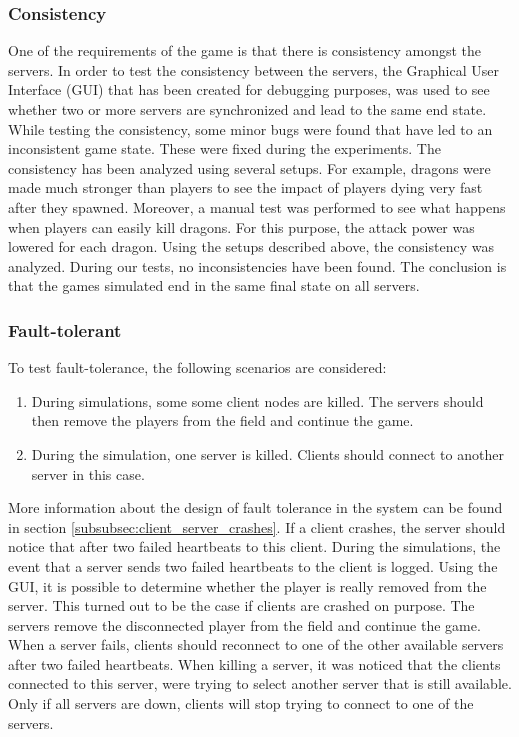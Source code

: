 	\subsubsection{Consistency}
	\label{subsubsec:consistency}
		One of the requirements of the game is that there is consistency amongst the servers.
		In order to test the consistency between the servers, the Graphical User Interface (GUI) that has been created for debugging purposes, was used to see whether two or more servers are synchronized and lead to the same end state.
		While testing the consistency, some minor bugs were found that have led to an inconsistent game state. These were fixed during the experiments.
		The consistency has been analyzed using several setups. For example, dragons were made much stronger than players to see the impact of players dying very fast after they spawned.
		Moreover, a manual test was performed to see what happens when players can easily kill dragons. For this purpose, the attack power was lowered for each dragon.
		Using the setups described above, the consistency was analyzed. During our tests, no inconsistencies have been found. The conclusion is that the games simulated end in the same final state on all servers.
		
	\subsubsection{Fault-tolerant}
	\label{subsubsec:fault-tolerant}
		To test fault-tolerance, the following scenarios are considered:
		\begin{enumerate}
			\item During simulations, some some client nodes are killed. The servers should then remove the players from the field and continue the game.
			\item During the simulation, one server is killed. Clients should connect to another server in this case.
		\end{enumerate}
		
		More information about the design of fault tolerance in the system can be found in section \ref{subsubsec:client_server_crashes}. If a client crashes, the server should notice that after two failed heartbeats to this client. During the simulations, the event that a server sends two failed heartbeats to the client is logged. Using the GUI, it is possible to determine whether the player is really removed from the server. This turned out to be the case if clients are crashed on purpose. The servers remove the disconnected player from the field and continue the game.\\
		When a server fails, clients should reconnect to one of the other available servers after two failed heartbeats. When killing a server, it was noticed that the clients connected to this server, were trying to select another server that is still available. Only if all servers are down, clients will stop trying to connect to one of the servers.
		
